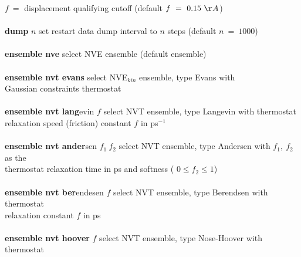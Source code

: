 \begin{tabbing}
\>                                              \> $f~=$ displacement qualifying cutoff (default $f~=~0.15~\AA$) \\
\>                                              \> \\
\> {\bf dump} $n$                               \> set restart data dump interval to $n$ steps (default $n~=~1000$) \\
\>                                              \> \\
\> {\bf ensemble nve}                           \> select NVE ensemble (default ensemble) \\
\>                                              \> \\
\> {\bf ensemble nvt evans}                     \> select NVE$_{kin}$ ensemble, type Evans with \\
\>                                              \> Gaussian constraints thermostat \\
\>                                              \> \\
\> {\bf ensemble nvt lang}evin $f$              \> select NVT ensemble, type Langevin with thermostat \\
\>                                              \> relaxation speed (friction) constant $f$ in ps$^{-1}$ \\
\>                                              \> \\
\> {\bf ensemble nvt ander}sen $f_{1}~f_{2}$    \> select NVT ensemble, type Andersen with $f_{1},~f_{2}$ as the \\
\>                                              \> thermostat relaxation time in ps and softness ( $0 \le f_{2} \le 1$) \\
\>                                              \> \\
\> {\bf ensemble nvt ber}endesen $f$            \> select NVT ensemble, type Berendsen with thermostat \\
\>                                              \> relaxation constant $f$ in ps \\
\>                                              \> \\
\> {\bf ensemble nvt hoover} $f$                \> select NVT ensemble, type Nose-Hoover with thermostat \\

\end{tabbing}
